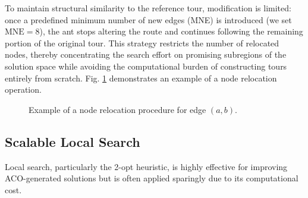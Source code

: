 \documentclass[a4paper,conference]{IEEEtran}
\begin{document}
To maintain structural similarity to the reference tour, modification is limited: once a predefined minimum number of new edges (MNE) is introduced (we set $\mathrm{MNE}=8$), the ant stops altering the route and continues following the remaining portion of the original tour. This strategy restricts the number of relocated nodes, thereby concentrating the search effort on promising subregions of the solution space while avoiding the computational burden of constructing tours entirely from scratch. Fig. \ref{fig:perm-swap} demonstrates an example of a node relocation operation.

\begin{figure}[ht]
    \centering
    \caption{Example of a node relocation procedure for edge $(a, b)$.}
    \label{fig:perm-swap}
\end{figure}

\subsection{Scalable Local Search}
Local search, particularly the 2-opt heuristic, is highly effective for improving ACO-generated solutions but is often applied sparingly due to its computational cost.
\end{document}
